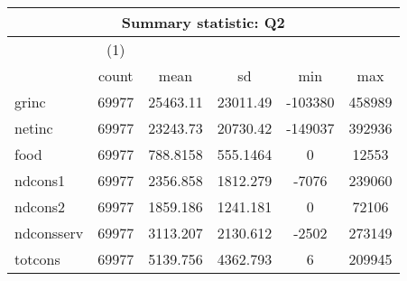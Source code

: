 \begin{tabular}{l*{1}{ccccc}}
\hline\hline
\multicolumn{6}{c}{Summary statistic: Q2}  \\
\hline
            &\multicolumn{1}{c}{(1)}&            &            &            &            \\
            &       count&        mean&          sd&         min&         max\\
\hline
grinc       &       69977&    25463.11&    23011.49&     -103380&      458989\\
netinc      &       69977&    23243.73&    20730.42&     -149037&      392936\\
food        &       69977&    788.8158&    555.1464&           0&       12553\\
ndcons1     &       69977&    2356.858&    1812.279&       -7076&      239060\\
ndcons2     &       69977&    1859.186&    1241.181&           0&       72106\\
ndconsserv  &       69977&    3113.207&    2130.612&       -2502&      273149\\
totcons     &       69977&    5139.756&    4362.793&           6&      209945\\
\hline\hline
\end{tabular}
